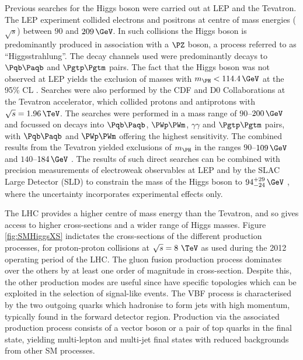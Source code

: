 Previous searches for the Higgs boson were carried out at LEP and the
Tevatron. The LEP experiment collided electrons and positrons at centre of mass
energies ($\sqrt{s}$) between $90$ and $209\,\GeV$. In such collisions the Higgs
boson is predominantly produced in association with a $\PZ$ boson, a process
referred to as ``Higgsstrahlung''. The decay channels used were predominantly decays
to $\Pqb\Paqb$ and $\Pgtp\Pgtm$ pairs. The fact that the Higgs boson was not
observed at LEP yields the exclusion of masses with $m_{\PH}<114.4\,\GeV$ at the
95\% \ac{CL} \cite{Barate:2003sz}. Searches were also performed by the CDF and D0 Collaborations at
the Tevatron accelerator, which collided protons and antiprotons with
$\sqrt{s}=1.96\,\TeV$. The searches were performed in a mass range of
$90$--$200\,\GeV$ and focussed on decays into $\Pqb\Paqb$, $\PWp\PWm$,
$\gamma\gamma$ and $\Pgtp\Pgtm$ pairs, with  $\Pqb\Paqb$ and $\PWp\PWm$ offering
the highest sensitivity. The combined results from the Tevatron yielded
exclusions of $m_{\PH}$ in the ranges $90$--$109\,\GeV$ and $140$--$184\,\GeV$
\cite{Aaltonen:2013kxa}. The results of such direct searches
can be combined with precision measurements of electroweak observables at LEP
and by the SLAC Large Detector (SLD) to constrain the mass of the Higgs
boson to $94^{+29}_{-24}\,\GeV$ \cite{lepewwg}, 
where the uncertainty incorporates experimental effects only.

The LHC provides a higher centre of mass energy than the Tevatron, and so
gives access to higher cross-sections and a wider range of Higgs masses. Figure
\ref{fig:SMHiggsXS} indictates the cross-sections of the different production
processes, for proton-proton collisions at $\sqrt{s}=8~\TeV$ as used during the 
2012 operating period of the LHC. The gluon fusion production process dominates 
over the others by at least one order of magnitude in cross-section. 
Despite this, the other production modes are useful since have specific 
topologies which can be exploited in the selection of signal-like events. 
The \ac{VBF} process is characterised by the two outgoing quarks which
hadronise to form jets with high momentum, typically found in the forward
detector region. Production via the associated production process consists of a vector
boson or a pair of top quarks in the final state, yielding multi-lepton and 
multi-jet final states with reduced backgrounds from other \ac{SM} processes.

